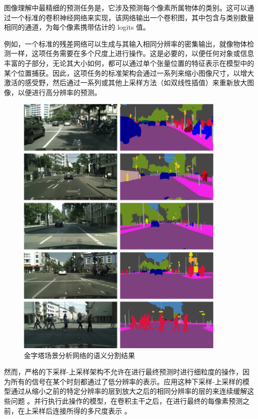 图像理解中最精细的预测任务是，它涉及预测每个像素所属物体的类别。这可以通过一个标准的卷积神经网络来实现，该网络输出一个卷积图，其中包含与类别数量相同的通道，为每个像素携带估计的 logits 值。

例如，一个标准的残差网络可以生成与其输入相同分辨率的密集输出，就像物体检测一样，这项任务需要在多个尺度上进行操作。这是必要的，以便任何对象或信息丰富的子部分，无论其大小如何，都可以通过单个张量位置的特征表示在模型中的某个位置捕获。因此，这项任务的标准架构会通过一系列来缩小图像尺寸，以增大激活的感受野，然后通过一系列或其他上采样方法（如双线性插值）来重新放大图像，以便进行高分辨率的预测。

\begin{figure}
    \centering
    \includegraphics[width=0.9\textwidth]{fig/fig6.3.png}
    \caption[用 PSP 进行语义分割]{金字塔场景分析网络的语义分割结果 \citep{arxiv-1612.01105}}
    \label{fig6.3}
\end{figure}

然而，严格的下采样-上采样架构不允许在进行最终预测时进行细粒度的操作，因为所有的信号在某个时刻都通过了低分辨率的表示。应用这种下采样-上采样的模型通过从缩小之前的特定分辨率的层到放大之后的相同分辨率的层的来连续缓解这些问题 \citep{arxiv-1411.4038, arxiv-1505.04597}。并行执行此操作的模型，在卷积主干之后，在进行最终的每像素预测之前，在上采样后连接所得的多尺度表示 \citep{arxiv-1612.01105}。

